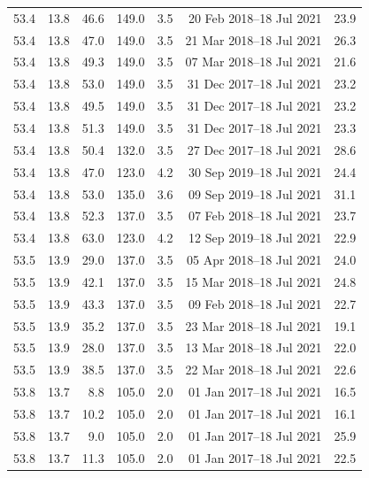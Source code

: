 \begin{table}
\begin{tabular}{rrrrrrr}
53.4 & 13.8 & 46.6 & 149.0 & 3.5 & 20 Feb 2018--18 Jul 2021 & 23.9 \\
53.4 & 13.8 & 47.0 & 149.0 & 3.5 & 21 Mar 2018--18 Jul 2021 & 26.3 \\
53.4 & 13.8 & 49.3 & 149.0 & 3.5 & 07 Mar 2018--18 Jul 2021 & 21.6 \\
53.4 & 13.8 & 53.0 & 149.0 & 3.5 & 31 Dec 2017--18 Jul 2021 & 23.2 \\
53.4 & 13.8 & 49.5 & 149.0 & 3.5 & 31 Dec 2017--18 Jul 2021 & 23.2 \\
53.4 & 13.8 & 51.3 & 149.0 & 3.5 & 31 Dec 2017--18 Jul 2021 & 23.3 \\
53.4 & 13.8 & 50.4 & 132.0 & 3.5 & 27 Dec 2017--18 Jul 2021 & 28.6 \\
53.4 & 13.8 & 47.0 & 123.0 & 4.2 & 30 Sep 2019--18 Jul 2021 & 24.4 \\
53.4 & 13.8 & 53.0 & 135.0 & 3.6 & 09 Sep 2019--18 Jul 2021 & 31.1 \\
53.4 & 13.8 & 52.3 & 137.0 & 3.5 & 07 Feb 2018--18 Jul 2021 & 23.7 \\
53.4 & 13.8 & 63.0 & 123.0 & 4.2 & 12 Sep 2019--18 Jul 2021 & 22.9 \\
53.5 & 13.9 & 29.0 & 137.0 & 3.5 & 05 Apr 2018--18 Jul 2021 & 24.0 \\
53.5 & 13.9 & 42.1 & 137.0 & 3.5 & 15 Mar 2018--18 Jul 2021 & 24.8 \\
53.5 & 13.9 & 43.3 & 137.0 & 3.5 & 09 Feb 2018--18 Jul 2021 & 22.7 \\
53.5 & 13.9 & 35.2 & 137.0 & 3.5 & 23 Mar 2018--18 Jul 2021 & 19.1 \\
53.5 & 13.9 & 28.0 & 137.0 & 3.5 & 13 Mar 2018--18 Jul 2021 & 22.0 \\
53.5 & 13.9 & 38.5 & 137.0 & 3.5 & 22 Mar 2018--18 Jul 2021 & 22.6 \\
53.8 & 13.7 & 8.8 & 105.0 & 2.0 & 01 Jan 2017--18 Jul 2021 & 16.5 \\
53.8 & 13.7 & 10.2 & 105.0 & 2.0 & 01 Jan 2017--18 Jul 2021 & 16.1 \\
53.8 & 13.7 & 9.0 & 105.0 & 2.0 & 01 Jan 2017--18 Jul 2021 & 25.9 \\
53.8 & 13.7 & 11.3 & 105.0 & 2.0 & 01 Jan 2017--18 Jul 2021 & 22.5 \\
\bottomrule
\end{tabular}
\end{table}
